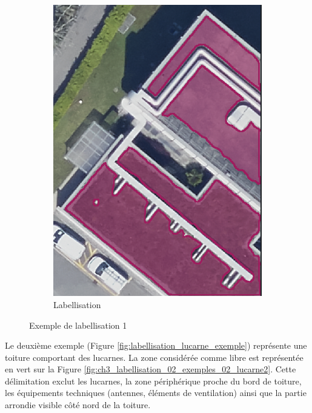 \begin{figure}[H]
\begin{subfigure}[b]{0.485\textwidth}
        \includegraphics[width=\textwidth]{02-main/figures/ch3/ch3_labellisation_02_exemples_01_acrotere2.png}
        \caption{Labellisation}
        \label{fig:ch3_labellisation_02_exemples_01_acrotere2}
    \end{subfigure}
    \caption{Exemple de labellisation 1}
    \label{fig:labellisation_acrotere_exemple}
\end{figure}

Le deuxième exemple (Figure \ref{fig:labellisation_lucarne_exemple}) représente une toiture comportant des lucarnes. La zone considérée comme libre est représentée en vert sur la Figure \ref{fig:ch3_labellisation_02_exemples_02_lucarne2}. Cette délimitation exclut les lucarnes, la zone périphérique proche du bord de toiture, les équipements techniques (antennes, éléments de ventilation) ainsi que la partie arrondie visible côté nord de la toiture.

